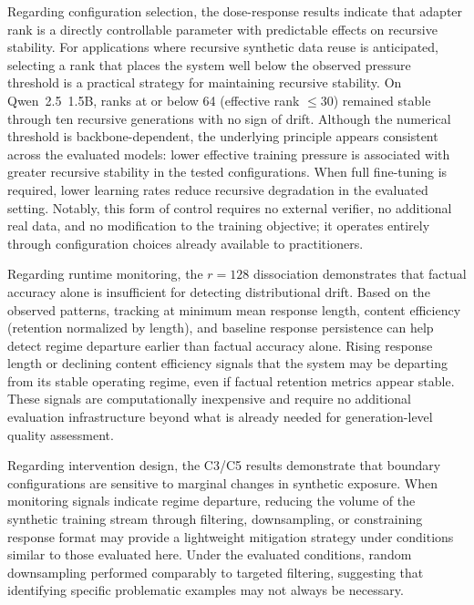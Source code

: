 \documentclass[a4paper,fleqn]{cas-dc}
\begin{document}
Regarding configuration selection, the dose-response results indicate that
adapter rank is a directly controllable parameter with predictable effects on
recursive stability. For applications where recursive synthetic data reuse is
anticipated, selecting a rank that places the system well below the observed
pressure threshold is a practical strategy for maintaining recursive stability.
On Qwen~2.5~1.5B, ranks at or below 64 (effective rank $\leq 30$) remained
stable through ten recursive generations with no sign of drift. Although
the numerical threshold is backbone-dependent, the underlying principle appears
consistent across the evaluated models: lower effective training pressure is
associated with greater recursive stability in the tested configurations. When
full fine-tuning is required, lower learning rates reduce recursive degradation
in the evaluated setting. Notably, this form of control requires no external
verifier, no additional real data, and no modification to the training objective;
it operates entirely through configuration choices already available to
practitioners.

Regarding runtime monitoring, the $r=128$ dissociation demonstrates that factual
accuracy alone is insufficient for detecting distributional drift. Based on the
observed patterns, tracking at minimum mean response length, content efficiency
(retention normalized by length), and baseline response persistence can help
detect regime departure earlier than factual accuracy alone. Rising response
length or declining content efficiency signals that the system may be departing
from its stable operating regime, even if factual retention metrics appear
stable. These signals are computationally inexpensive and require no additional
evaluation infrastructure beyond what is already needed for generation-level
quality assessment.

Regarding intervention design, the C3/C5 results demonstrate that boundary
configurations are sensitive to marginal changes in synthetic exposure. When
monitoring signals indicate regime departure, reducing the volume of the
synthetic training stream through filtering, downsampling, or constraining
response format may provide a lightweight mitigation strategy under conditions
similar to those evaluated here. Under the evaluated conditions, random
downsampling performed comparably to targeted filtering, suggesting that
identifying specific problematic examples may not always be necessary.
\end{document}
